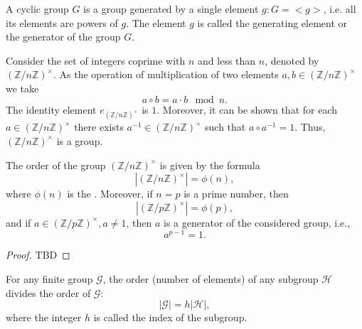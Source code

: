 \begin{definition}
A cyclic group $G$ is a group generated by a single
element $g: G = <g>$, i.e. all its elements are powers of $g$.
The element $g$ is called the generating element or the generator of the group $G$.
\label{def:add:algebra:cyclic_group}
\end{definition}

\begin{definition}
Consider the set of integers coprime with $n$ and less than $n$,
denoted by $\left(\mathbb{Z}/n\mathbb{Z}\right)^\times$. As the operation of multiplication of two elements $a,b \in
\left(\mathbb{Z}/n\mathbb{Z}\right)^\times$ we take
\[
a \circ b = a \cdot b \mod n.
\]
The identity element $e_{\left(\mathbb{Z}/n\mathbb{Z}\right)^\times}$
is $1$. Moreover, it can be shown that for
each $a \in \left(\mathbb{Z}/n\mathbb{Z}\right)^\times$
there exists $a^{-1} \in \left(\mathbb{Z}/n\mathbb{Z}\right)^\times$
such that $a \circ a^{-1} = 1$. Thus,
$\left(\mathbb{Z}/n\mathbb{Z}\right)^\times$ is a group.
\label{def:add:algebra:mult_group}
\end{definition}

\begin{theorem}
The order of the group $\left(\mathbb{Z}/n\mathbb{Z}\right)^\times$
is given by the formula
\[
\left|\left(\mathbb{Z}/n\mathbb{Z}\right)^\times\right| = \phi(n),
\]
where $\phi(n)$ is the .
Moreover, if
$n=p$ is a prime number, then
\[
\left|\left(\mathbb{Z}/p\mathbb{Z}\right)^\times\right| = \phi(p),
\]
and if $a \in \left(\mathbb{Z}/p\mathbb{Z}\right)^\times, a \ne 1$,
then $a$ is a generator of the considered group, i.e.,
\[
a^{p-1} = 1.
\]
\begin{proof}
TBD
\end{proof}
\label{thm:add:algebra:cyclic_mult_group}
\end{theorem}

\begin{theorem}[Lagrange]
\label{thm:lagrange}
For any finite group $\mathcal{G}$, the order (number of elements)
of any subgroup $\mathcal{H}$ divides the order of $\mathcal{G}$:
\[
\left|\mathcal{G}\right| = h \left|\mathcal{H}\right|,
\] 
where the integer $h$ is called the index of the subgroup.
\end{theorem}